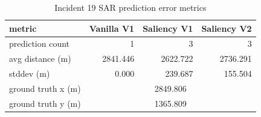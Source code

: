 \begin{table}[ht]
\centering
\caption{Incident 19 SAR prediction error metrics}
\label{tab:sar-incident-19}
\begin{tabular}{lrrr}
\hline
metric & Vanilla V1 & Saliency V1 & Saliency V2 \\
\hline
prediction count & 1 & 3 & 3 \\
avg distance (m) & 2841.446 & 2622.722 & 2736.291 \\
stddev (m) & 0.000 & 239.687 & 155.504 \\
ground truth x (m) & \multicolumn{3}{c}{2849.806} \\
ground truth y (m) & \multicolumn{3}{c}{1365.809} \\
\hline
\end{tabular}
\end{table}
